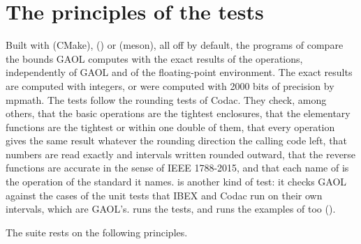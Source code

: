 \section{The principles of the tests}\label{sec:test-principles}
%

Built with  (CMake), 
() or  (meson), all off by default, the
programs of  compare the bounds GAOL computes with the exact
results of the operations, independently of GAOL and of the floating-point
environment. The exact results are computed with integers, or were computed
with 2000 bits of precision by mpmath. The tests follow the rounding tests
of Codac. They check, among others, that the basic operations are the
tightest enclosures, that the elementary functions are the tightest or
within one double of them, that every operation gives the same result
whatever the rounding direction the calling code left, that numbers are read
exactly and intervals written rounded outward, that the reverse functions
are accurate in the sense of IEEE 1788-2015, and that each name of
 is the operation of the standard it names.
 is another kind of test: it checks GAOL against the
cases of the unit tests that IBEX and Codac run on their own intervals,
which are GAOL's.  runs the tests, and  runs
the examples of  too ().

\medskip
The suite rests on the following principles.


